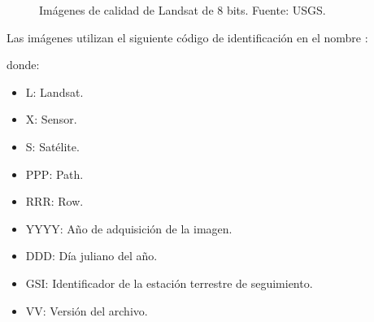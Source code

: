 \begin{figure}
	\centering
	\caption[Imágenes de calidad de Landsat]{Imágenes de calidad de Landsat de 8 bits. Fuente: USGS.}
	\label{fig:imagenescalidad}
\end{figure}

Las imágenes utilizan el siguiente código de identificación en el nombre \citep{Ariza2013} \citep{USGS2015}:

\begin{center}
\end{center}

\noindent donde:

\begin{itemize}
	\item L: Landsat.
	\item X: Sensor.
	\item S: Satélite.
	\item PPP: Path.
	\item RRR: Row.
	\item YYYY: Año de adquisición de la imagen.
	\item DDD: Día juliano del año.
	\item GSI: Identificador de la estación terrestre de seguimiento.
	\item VV: Versión del archivo.
\end{itemize}

